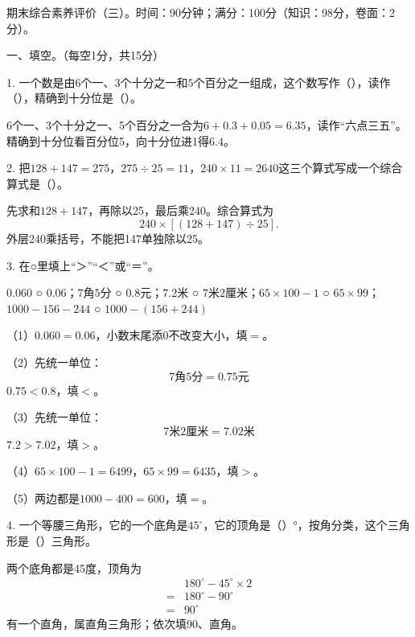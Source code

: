期末综合素养评价（三）。时间：90分钟；满分：100分（知识：98分，卷面：2分）。\par 一、填空。（每空1分，共15分）\par 1. 一个数是由\(6\)个一、\(3\)个十分之一和\(5\)个百分之一组成，这个数写作（\hspace{1.8em}），读作（\hspace{1.8em}），精确到十分位是（\hspace{1.8em}）。\par
\begin{BookAnswer}
6个一、3个十分之一、5个百分之一合为\(6+0.3+0.05=6.35\)，读作“六点三五”。精确到十分位看百分位5，向十分位进1得\(6.4\)。
\end{BookAnswer}

2. 把\(128+147=275\)，\allowbreak{}\(275\div25=11\)，\allowbreak{}\(240\times11=2640\)这三个算式写成一个综合算式是（\hspace{1.8em}）。\par
\begin{BookAnswer}
先求和\(128+147\)，再除以25，最后乘240。综合算式为\[240\times[(128+147)\div25].\]外层240乘括号，不能把147单独除以25。
\end{BookAnswer}

3. 在○里填上“＞”“＜”或“＝”。\par \(0.060\) ○ \(0.06\)；\allowbreak{}\(7\)角\(5\)分 ○ \(0.8\)元；\allowbreak{}\(7.2\)米 ○ \(7\)米\(2\)厘米；\allowbreak{}\(65\times100-1\) ○ \(65\times99\)；\allowbreak{}\(1000-156-244\) ○ \(1000-(156+244)\)\par
\begin{BookAnswer}
（1）\(0.060=0.06\)，小数末尾添0不改变大小，填\(=\)。\par （2）先统一单位：\[7\text{角}5\text{分}=0.75\text{元}\]\(0.75<0.8\)，填\(<\)。\par （3）先统一单位：\[7\text{米}2\text{厘米}=7.02\text{米}\]\(7.2>7.02\)，填\(>\)。\par （4）\(65\times100-1=6499\)，\allowbreak{}\(65\times99=6435\)，填\(>\)。\par （5）两边都是\(1000-400=600\)，填\(=\)。
\end{BookAnswer}

4. 一个等腰三角形，它的一个底角是\(45^\circ\)，它的顶角是（\hspace{1.8em}）°，按角分类，这个三角形是（\hspace{1.8em}）三角形。\par
\begin{BookAnswer}
两个底角都是45度，顶角为\[\begin{aligned} &180^\circ-45^\circ\times2\\ ={}&180^\circ-90^\circ\\ ={}&90^\circ\end{aligned}\]有一个直角，属直角三角形；依次填90、直角。
\end{BookAnswer}

